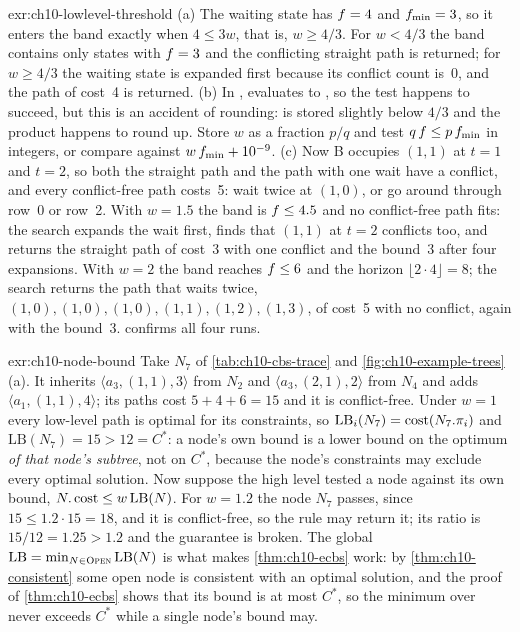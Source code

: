 \begin{solution}{exr:ch10-lowlevel-threshold}
(a) The waiting state has $f=4$ and $f_{\min}=3$, so it enters the band exactly when $4\le3w$, that is, $w\ge4/3$. For $w<4/3$ the band contains only states with $f=3$ and the conflicting straight path is returned; for $w\ge4/3$ the waiting state is expanded first because its conflict count is~$0$, and the path of cost~4 is returned. (b) In \python,  evaluates to , so the test happens to succeed, but this is an accident of rounding:  is stored slightly below $4/3$ and the product happens to round up. Store $w$ as a fraction $p/q$ and test $q\,f\le p\,f_{\min}$ in integers, or compare against $w\,f_{\min}+10^{-9}$. (c) Now B occupies $(1,1)$ at $t=1$ and $t=2$, so both the straight path and the path with one wait have a conflict, and every conflict-free path costs~5: wait twice at $(1,0)$, or go around through row~0 or row~2. With $w=1.5$ the band is $f\le4.5$ and no conflict-free path fits: the search expands the wait first, finds that $(1,1)$ at $t=2$ conflicts too, and returns the straight path of cost~3 with one conflict and the bound~3 after four expansions. With $w=2$ the band reaches $f\le6$ and the horizon $\lfloor2\cdot4\rfloor=8$; the search returns the path that waits twice, $(1,0),(1,0),(1,0),(1,1),(1,2),(1,3)$, of cost~5 with no conflict, again with the bound~3.  confirms all four runs.
\end{solution}

\begin{solution}{exr:ch10-node-bound}
Take $N_7$ of \cref{tab:ch10-cbs-trace} and \cref{fig:ch10-example-trees}(a). It inherits $\langle a_3,(1,1),3\rangle$ from $N_2$ and $\langle a_3,(2,1),2\rangle$ from $N_4$ and adds $\langle a_1,(1,1),4\rangle$; its paths cost $5+4+6=15$ and it is conflict-free. Under $w=1$ every low-level path is optimal for its constraints, so $\mathrm{LB}_i(N_7)=\operatorname{cost}(N_7.\pi_i)$ and $\mathrm{LB}(N_7)=15>12=C^*$: a node's own bound is a lower bound on the optimum \emph{of that node's subtree}, not on $C^*$, because the node's constraints may exclude every optimal solution. Now suppose the high level tested a node against its own bound, $N.\operatorname{cost}\le w\,\mathrm{LB}(N)$. For $w=1.2$ the node $N_7$ passes, since $15\le1.2\cdot15=18$, and it is conflict-free, so the rule may return it; its ratio is $15/12=1.25>1.2$ and the guarantee is broken. The global $\mathrm{LB}=\min_{N\in\textsc{Open}}\mathrm{LB}(N)$ is what makes \cref{thm:ch10-ecbs} work: by \cref{thm:ch10-consistent} some open node is consistent with an optimal solution, and the proof of \cref{thm:ch10-ecbs} shows that its bound is at most $C^*$, so the minimum over \Open never exceeds $C^*$ while a single node's bound may.
\end{solution}

